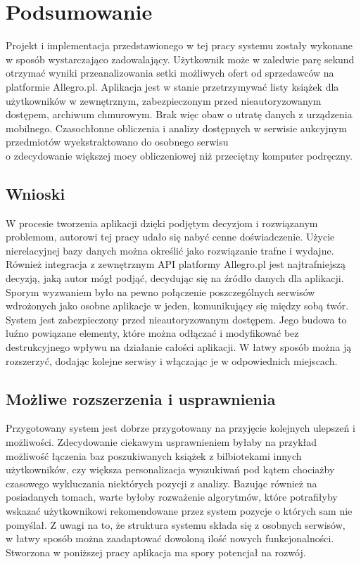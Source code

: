 \chapter{Podsumowanie}
\label{cha:podsumowanie}

Projekt i implementacja przedstawionego w tej pracy systemu zostały wykonane\\w sposób wystarczająco zadowalający. Użytkownik może w zaledwie parę sekund otrzymać wyniki przeanalizowania setki możliwych ofert od sprzedawców na platformie Allegro.pl. Aplikacja jest w stanie przetrzymywać listy książek dla użytkowników w zewnętrznym, zabezpieczonym przed nieautoryzowanym dostępem, archiwum chmurowym. Brak więc obaw o utratę danych z urządzenia mobilnego. Czasochłonne obliczenia i analizy dostępnych w serwisie aukcyjnym przedmiotów wyekstraktowano do osobnego serwisu\\o zdecydowanie większej mocy obliczeniowej niż przeciętny komputer podręczny.

\section{Wnioski}
W procesie tworzenia aplikacji dzięki podjętym decyzjom i rozwiązanym problemom, autorowi tej pracy udało się nabyć cenne doświadczenie. 
Użycie nierelacyjnej bazy danych można określić jako rozwiązanie trafne i wydajne. Również integracja z zewnętrznym API platformy Allegro.pl jest najtrafniejszą decyzją, jaką autor mógł podjąć, decydując się na źródło danych dla aplikacji.\newline
Sporym wyzwaniem było na pewno połączenie poszczególnych serwisów wdrożonych jako osobne aplikacje w jeden, komunikujący się między sobą twór.\newline
System jest zabezpieczony przed nieautoryzowanym dostępem. Jego budowa to luźno powiązane elementy, które można odłączać i modyfikować bez destrukcyjnego wpływu na działanie całości aplikacji.
W łatwy sposób można ją rozszerzyć, dodając kolejne serwisy i włączając je w odpowiednich miejscach.

\newpage
\section{Możliwe rozszerzenia i usprawnienia}
Przygotowany system jest dobrze przygotowany na przyjęcie kolejnych ulepszeń i możliwości.\newline
Zdecydowanie ciekawym usprawnieniem byłaby na przykład możliwość łączenia baz poszukiwanych książek z bilbiotekami innych użytkowników, czy większa personalizacja wyszukiwań pod kątem chociażby czasowego wykluczania niektórych pozycji z analizy.\newline
Bazując również na posiadanych tomach, warte byłoby rozważenie algorytmów, które potrafiłyby wskazać użytkownikowi rekomendowane przez system pozycje o których sam nie pomyślał.
Z uwagi na to, że struktura systemu składa się z osobnych serwisów,\\w łatwy sposób można zaadaptować dowoloną ilość nowych funkcjonalności.\newline
Stworzona w poniższej pracy aplikacja ma spory potencjał na rozwój.